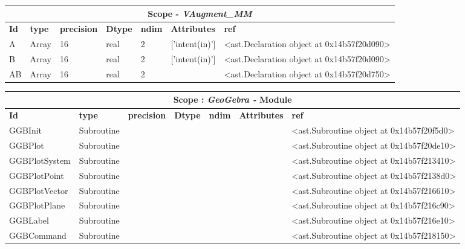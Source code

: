\documentclass{report}
\begin{document}
\begin{center}
\begin{longtable}{|p{3.5cm}|p{1.5cm}|p{1.5cm}|p{1.5cm}|p{1cm}|p{2cm}|p{4cm}| }
\hline
\multicolumn{7}{|c|}{\textbf{Scope} -  \textbf{\textit{VAugment\_MM}}} \\ 
\hline
\textbf{Id} & \textbf{type} & \textbf{precision} & \textbf{Dtype} & \textbf{ndim} & \textbf{Attributes} & \textbf{ref} \\\hline

A & Array & 16 & real & 2 & ['intent(in)'] & <ast.Declaration object at 0x14b57f20d090> \\\hline

B & Array & 16 & real & 2 & ['intent(in)'] & <ast.Declaration object at 0x14b57f20d090> \\\hline

AB & Array & 16 & real & 2 &  & <ast.Declaration object at 0x14b57f20d750> \\\hline

\end{longtable}
\end{center}

 \vspace{1cm}

\begin{center}
\begin{longtable}{|p{3.5cm}|p{1.5cm}|p{1.5cm}|p{1.5cm}|p{1cm}|p{2cm}|p{4cm}| }
\hline
\multicolumn{7}{|c|}{\textbf{Scope : \qquad}  \textbf{\textit{GeoGebra - }Module}}\\ 
\hline
\textbf{Id} & \textbf{type} & \textbf{precision} & \textbf{Dtype} & \textbf{ndim} & \textbf{Attributes} & \textbf{ref} \\\hline

GGBInit & Subroutine &  &  &  &  & <ast.Subroutine object at 0x14b57f20f5d0> \\\hline

GGBPlot & Subroutine &  &  &  &  & <ast.Subroutine object at 0x14b57f20de10> \\\hline

GGBPlotSystem & Subroutine &  &  &  &  & <ast.Subroutine object at 0x14b57f213410> \\\hline

GGBPlotPoint & Subroutine &  &  &  &  & <ast.Subroutine object at 0x14b57f2138d0> \\\hline

GGBPlotVector & Subroutine &  &  &  &  & <ast.Subroutine object at 0x14b57f216610> \\\hline

GGBPlotPlane & Subroutine &  &  &  &  & <ast.Subroutine object at 0x14b57f216c90> \\\hline

GGBLabel & Subroutine &  &  &  &  & <ast.Subroutine object at 0x14b57f216e10> \\\hline

GGBCommand & Subroutine &  &  &  &  & <ast.Subroutine object at 0x14b57f218150> \\\hline

\end{longtable}
\end{center}
\end{document}
